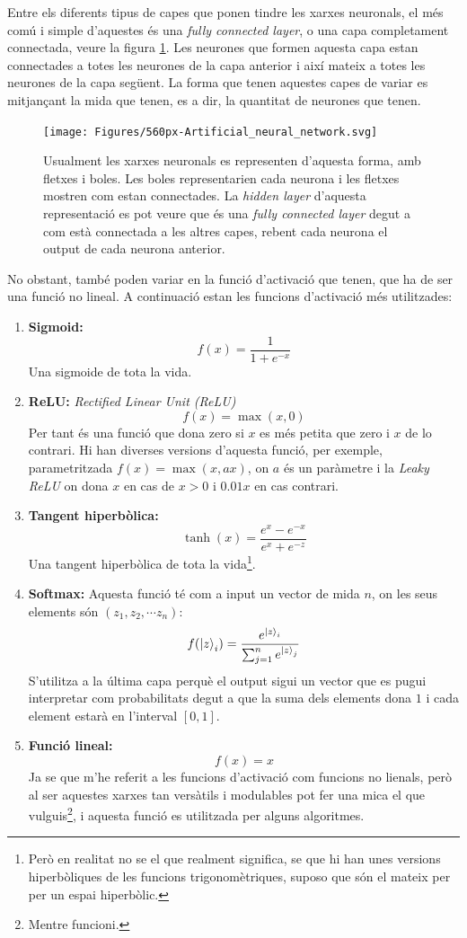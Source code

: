 Entre els diferents tipus de capes que ponen tindre les xarxes neuronals, el més comú i simple d'aquestes és una \textit{fully connected layer}, o una capa completament connectada, veure la figura \ref{fig:560px-artificialneuralnetwork}. Les neurones que formen aquesta capa estan connectades a totes les neurones de la capa anterior i així mateix a totes les neurones de la capa següent. La forma que tenen aquestes capes de variar es mitjançant la mida que tenen, es a dir, la quantitat de neurones que tenen. \begin{figure}
	\centering
	\texttt{[image: Figures/560px-Artificial\_neural\_network.svg]}
	\caption{Usualment les xarxes neuronals es representen d'aquesta forma, amb fletxes i boles. Les boles representarien cada neurona i les fletxes mostren com estan connectades. La \textit{hidden layer} d'aquesta representació es pot veure que és una \textit{fully connected layer} degut a com està connectada a les altres capes, rebent cada neurona el output de cada neurona anterior.}
	\label{fig:560px-artificialneuralnetwork}
\end{figure}
No obstant, també poden variar en la funció d'activació que tenen, que ha de ser una funció no lineal. A continuació estan les funcions d'activació més utilitzades:
\begin{enumerate}
	\item \textbf{Sigmoid:}
	$$
	f(x) = \frac{1}{1+e^{-x}}
	$$
	Una sigmoide de tota la vida.
	\item \textbf{ReLU:}
	\textit{Rectified Linear Unit (ReLU)}
	$$
	f(x) =\max(x,0)
	$$
	Per tant és una funció que dona zero si $x$ es més petita que zero i $x$ de lo contrari. Hi han diverses versions d'aquesta funció, per exemple, parametritzada $f(x) = \max(x,ax)$, on $a$ és un 
	paràmetre i la \textit{Leaky ReLU} on dona $x$ en cas de $x>0$ i $0.01x$ en cas contrari.
	\item \textbf{Tangent hiperbòlica:}
	$$
	\tanh(x) = \frac{e^x - e^{-x}}{e^x + e^{-z}}
	$$
	Una tangent hiperbòlica de tota la vida\footnote{Però en realitat no se el que realment significa, se que hi han unes versions hiperbòliques de les funcions trigonomètriques, suposo que són el mateix per per un espai hiperbòlic.}.
	\item \textbf{Softmax:}
	Aquesta funció té com a input un vector de mida $n$, on les seus elements són $(z_1, z_2, \cdots z_n)$:
	$$
	f(\ket{z}_i) = \frac{e^{\ket{z}_i}}{\sum_{j=1}^{n} e^{\ket{z}_j}}
	$$
	S'utilitza a la última capa perquè el output sigui un vector que es pugui interpretar com probabilitats degut a que la suma dels elements dona $1$ i cada element estarà en l'interval $[0,1]$.
	\item \textbf{Funció lineal:}
	$$
	f(x) = x
	$$
	Ja se que m'he referit a les funcions d'activació com funcions no lienals, però al ser aquestes xarxes tan versàtils i modulables pot fer una mica el que vulguis\footnote{Mentre funcioni.}, i aquesta funció es utilitzada per alguns algoritmes.
\end{enumerate}

